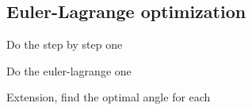 \subsection{Euler-Lagrange optimization}







Do the step by step one

Do the euler-lagrange one

Extension, find the optimal angle for each

